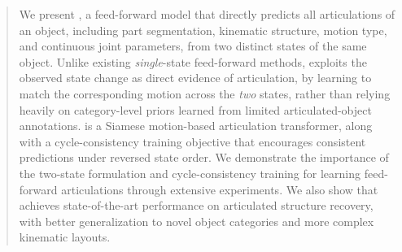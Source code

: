 \begin{abstract}

We present \method,
a feed-forward model that directly predicts all articulations of an object,
including part segmentation, kinematic structure, motion type, and continuous joint parameters,
from two distinct states of the same object.
Unlike existing \emph{single}-state feed-forward methods,
\method exploits the observed state change as direct evidence of articulation,
by learning to match the corresponding motion across the \emph{two} states,
rather than relying heavily on category-level priors learned from limited articulated-object annotations.
\method is a Siamese motion-based articulation transformer,
along with a cycle-consistency training objective that encourages consistent predictions under reversed state order.
We demonstrate the importance of the two-state formulation and cycle-consistency training for learning feed-forward articulations through extensive experiments.
We also show that \method achieves state-of-the-art performance on articulated structure recovery, with better generalization to novel object categories and more complex kinematic layouts.

\end{abstract}
